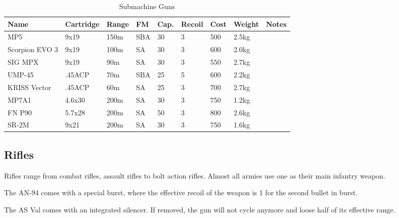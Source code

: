 \begin{table}
  \caption{Submachine Guns}
  \label{tab:SMG}
  \begin{center}
    \begin{tabular}{| l | l | l | l | l | l | l | l | l |}
      \hline
      \textbf{Name} & \textbf{Cartridge} & \textbf{Range} &
      \textbf{FM} & \textbf{Cap.} & \textbf{Recoil} &
      \textbf{Cost} & \textbf{Weight} & \textbf{Notes} \\ \hline

      MP5            & 9x19   & 150m & SBA & 30 & 3 & 500 & 2.5kg & \\ \hline
      Scorpion EVO 3 & 9x19   & 100m & SA  & 30 & 3 & 600 & 2.0kg & \\ \hline
      SIG MPX        & 9x19   &  90m & SA  & 30 & 3 & 550 & 2.7kg & \\ \hline

      UMP-45         & .45ACP &  70m & SBA & 25 & 5 & 600 & 2.2kg & \\ \hline
      KRISS Vector   & .45ACP &  60m & SA  & 25 & 3 & 700 & 2.7kg & \\ \hline

      MP7A1          & 4.6x30 & 200m & SA  & 30 & 3 & 750 & 1.2kg & \\ \hline
      FN P90         & 5.7x28 & 200m & SA  & 50 & 3 & 800 & 2.6kg & \\ \hline
      SR-2M          & 9x21   & 200m & SA  & 30 & 3 & 750 & 1.6kg & \\ \hline

    \end{tabular}
  \end{center}
\end{table}

\subsection{Rifles}
\label{sub:10-Rifles}

Rifles range from combat rifles, assault rifles to bolt action rifles. Almost
all armies use one as their main infantry weapon.

The AN-94 comes with a special burst, where the effective recoil of the weapon
is 1 for the second bullet in burst.

The AS Val comes with an integrated silencer. If removed, the gun will not
cycle anymore and loose half of its effective range.

